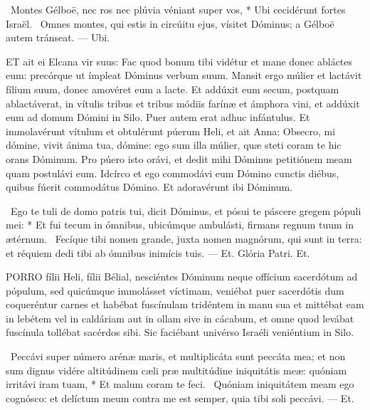 \R\ Montes Gélboë, nec ros nec plúvia véniant super vos, * Ubi cecidérunt fortes Israël. \V\ Omnes montes, qui estis in circúitu ejus, vísitet Dóminus; a Gélboë autem tránseat. --- Ubi.



\lettrine[lines=2]{E}{T} ait ei Elcana vir suus: Fac quod bonum tibi vidétur et mane donec abláctes eum: precórque ut ímpleat Dóminus verbum suum. Mansit ergo múlier et lactávit fílium suum, donec amovéret eum a lacte. Et addúxit eum secum, postquam ablactáverat, in vítulis tribus et tribus módiis farínæ et ámphora vini, et addúxit eum ad domum Dómini in Silo. Puer autem erat adhuc infántulus. Et immolavérunt vítulum et obtulérunt púerum Heli, et ait Anna: Obsecro, mi dómine, vivit ánima tua, dómine: ego sum illa múlier, quæ steti coram te hic orans Dóminum. Pro púero isto orávi, et dedit mihi Dóminus petitiónem meam quam postulávi eum. Idcírco et ego commodávi eum Dómino cunctis diébus, quibus fúerit commodátus Dómino. Et adoravérunt ibi Dóminum.

\R\ Ego te tuli de domo patris tui, dicit Dóminus, et pósui te páscere gregem pópuli mei: * Et fui tecum in ómnibus, ubicúmque ambulásti, firmans regnum tuum in ætérnum. \V\ Fecíque tibi nomen grande, juxta nomen magnórum, qui sunt in terra: et réquiem dedi tibi ab ómnibus inimícis tuis. --- Et. Glória Patri. Et.




\lettrine[lines=2]{P}{ORRO} fílii Heli, fílii Bélial, nesciéntes Dóminum neque offícium sacerdótum ad pópulum, sed quicúmque immolásset víctimam, veniébat puer sacerdótis dum coqueréntur carnes et habébat fuscínulam tridéntem in manu sua et mittébat eam in lebétem vel in caldáriam aut in ollam sive in cácabum, et omne quod levábat fuscínula tollébat sacérdos sibi. Sic faciébant univérso Israéli veniéntium in Silo.

\R\ Peccávi super número arénæ maris, et multiplicáta sunt peccáta mea; et non sum dignus vidére altitúdinem cæli præ multitúdine iniquitátis meæ: quóniam irritávi iram tuam, * Et malum coram te feci. \V\ Quóniam iniquitátem meam ego cognósco: et delíctum meum contra me est semper, quia tibi soli peccávi. --- Et.


